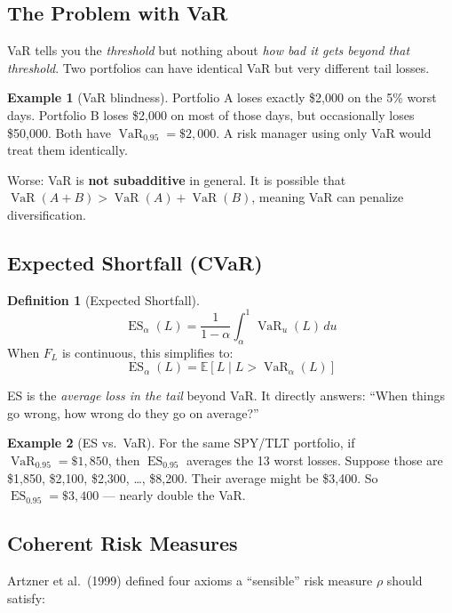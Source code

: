 \documentclass[11pt, a4paper]{article}
\theoremstyle{definition}
\newtheorem{definition}{Definition}[section]
\newtheorem{example}{Example}[section]
\theoremstyle{plain}
\theoremstyle{remark}
\newcommand{\VaR}{\operatorname{VaR}}
\newcommand{\ES}{\operatorname{ES}}
\newcommand{\EV}{\mathbb{E}}
\begin{document}
\subsection{The Problem with VaR}

\begin{warningbox}
VaR tells you the \emph{threshold} but nothing about \emph{how bad it gets beyond that threshold}.
Two portfolios can have identical VaR but very different tail losses.
\end{warningbox}

\begin{example}[VaR blindness]
Portfolio A loses exactly \$2{,}000 on the 5\% worst days.
Portfolio B loses \$2{,}000 on most of those days, but occasionally loses \$50{,}000.
Both have $\VaR_{0.95} = \$2{,}000$.
A risk manager using only VaR would treat them identically.
\end{example}

Worse: VaR is \textbf{not subadditive} in general.
It is possible that $\VaR(A+B) > \VaR(A) + \VaR(B)$, meaning VaR can penalize diversification.

\subsection{Expected Shortfall (CVaR)}

\begin{definition}[Expected Shortfall]
\[
    \ES_\alpha(L) = \frac{1}{1-\alpha} \int_\alpha^1 \VaR_u(L) \, du
\]
When $F_L$ is continuous, this simplifies to:
\[
    \ES_\alpha(L) = \EV[L \mid L > \VaR_\alpha(L)]
\]
\end{definition}

ES is the \emph{average loss in the tail} beyond VaR.
It directly answers: ``When things go wrong, how wrong do they go on average?''

\begin{example}[ES vs.\ VaR]
For the same SPY/TLT portfolio, if $\VaR_{0.95} = \$1{,}850$, then $\ES_{0.95}$ averages the 13 worst losses.
Suppose those are \$1{,}850, \$2{,}100, \$2{,}300, \ldots, \$8{,}200.
Their average might be \$3{,}400.
So $\ES_{0.95} = \$3{,}400$ --- nearly double the VaR.
\end{example}

\subsection{Coherent Risk Measures}

Artzner et al.\ (1999) defined four axioms a ``sensible'' risk measure $\rho$ should satisfy:
\end{document}

